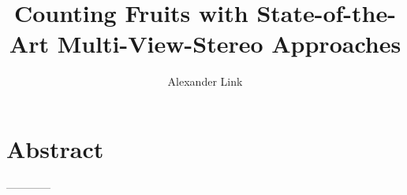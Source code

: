 \documentclass[english, egger, bsc]{vcethesis}
\title{Counting Fruits with State-of-the-Art Multi-View-Stereo Approaches}
\author{Alexander Link}
\begin{document}
\prepages
\maketitle
\cleardoublepage
\chapter*{Abstract}
------------
\tableofcontents
\cleardoublepage
\mainbody

\end{document}
